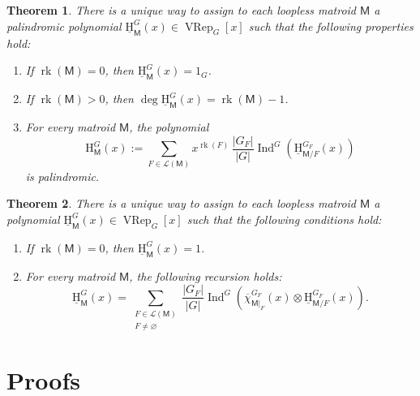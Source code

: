 \documentclass[10pt, a4paper, english]{amsart}
\theoremstyle{teoremas}
\newtheorem{theorem}{Theorem}[section]
\theoremstyle{definition}
\DeclareMathOperator{\rk}{rk}
\newcommand{\M}{\mathsf{M}}
\renewcommand{\H}{\mathrm{H}}
\newcommand{\uH}{\underline{\mathrm{H}}}
\newcommand{\VRep}{\operatorname{VRep}}
\newcommand{\Ind}{\operatorname{Ind}}
\begin{document}
\begin{theorem}\label{thm:main-recursion-defi-H-and-uH}
    There is a unique way to assign to each loopless matroid $\M$ a palindromic polynomial $\uH_{\M}^G(x) \in \VRep_G[x]$ such that the following properties hold:
    \begin{enumerate}[\normalfont(i)]
        \item If $\rk(\M) = 0$, then $\uH_{\M}^G(x) = 1_G$.\label{it:mainfirst}\
        \item If $\rk(\M) > 0$, then $\deg \uH_{\M}^G(x) = \rk(\M) - 1$.\label{it:mainsecond}
        \item For every matroid $\M$, the polynomial
            \[ \H_{\M}^G(x) := \sum_{F\in \mathcal{L}(\M)} x^{\rk(F)}\, \frac{|G_F|}{|G|}\Ind^G\left(\uH_{\M/F}^{G_F}(x)\right)\]
        is palindromic.\label{it:mainthird}
    \end{enumerate}
\end{theorem}

\begin{theorem}\label{thm:intro-main0}
    There is a unique way to assign to each loopless matroid $\M$  a polynomial $\uH_{\M}^G(x)\in \VRep_G[x]$ such that the following conditions hold:
    \begin{enumerate}[\normalfont(i)]
        \item If $\rk(\M) = 0$, then $\uH_{\M}^G(x) = 1$.
        \item For every matroid $\M$, the following recursion holds:
            \[ \uH_{\M}^G(x) = \sum_{\substack{F\in\mathcal{L}(\M)\\ F\neq\varnothing}} \frac{|G_F|}{|G|}\Ind^G\left(\overline{\chi}_{\M|_F}^{G_F}(x)\otimes \uH_{\M/F}^{G_F}(x)\right).\]
    \end{enumerate}
\end{theorem}

\section{Proofs}




\end{document}
